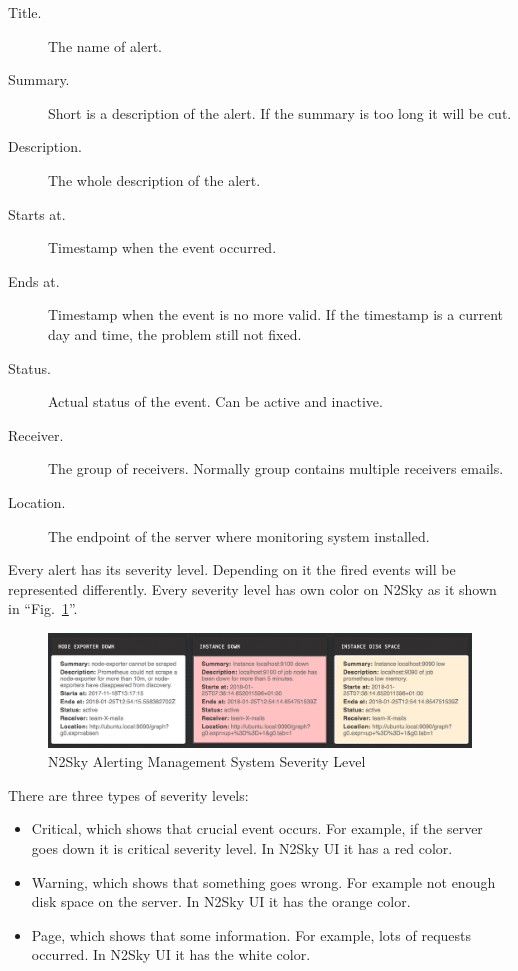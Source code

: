 \begin{description}
\item[Title.] The name of alert.
\item[Summary.]   Short is a description of the alert. If the summary is too long it will be cut.
\item[Description.] The whole description of the alert.
\item[Starts at.] Timestamp when the event occurred. 
\item[Ends at.] Timestamp when the event is no more valid. If the timestamp is a current day and time, the problem still not fixed. 
\item[Status.] Actual status of the event. Can be active and inactive.
\item[Receiver.] The group of receivers. Normally group contains multiple receivers emails. 
\item[Location.] The endpoint of the server where monitoring system installed. 
\end{description}

Every alert has its severity level. Depending on it the fired events will be represented differently. Every severity level has own color on N2Sky as it shown in ``Fig.~\ref{fig:alert_severity}''.

\begin{figure}[htbp]
\begin{center}
  \includegraphics[width=\linewidth]{components/3/alerts/alert_severity.png}
  \caption{N2Sky Alerting Management System Severity Level}
  \label{fig:alert_severity}
\end{center}
\end{figure}

There are three types of severity levels:
\begin{itemize}
\item Critical, which shows that crucial event occurs. For example, if the server goes down it is critical severity level.  In N2Sky UI it has a red color. 
\item Warning, which shows that something goes wrong. For example not enough disk space on the server. In N2Sky UI it has the orange color. 
\item Page, which shows that some information. For example, lots of requests occurred. In N2Sky UI it has the white color.  
\end{itemize}
 



